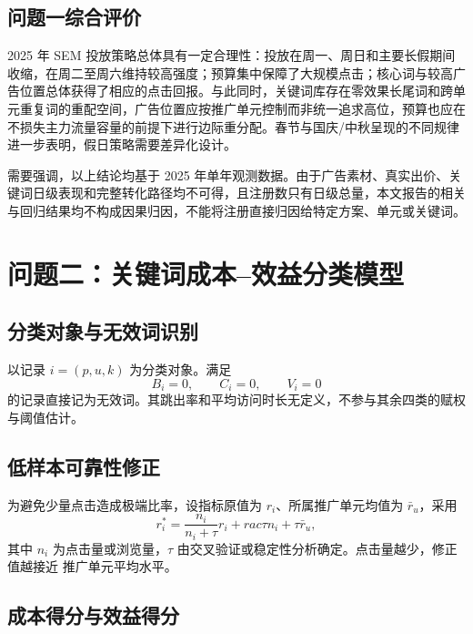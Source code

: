 \documentclass[UTF8,a4paper,zihao=-4]{ctexart}
\begin{document}
\subsection{问题一综合评价}

2025 年 SEM 投放策略总体具有一定合理性：投放在周一、周日和主要长假期间收缩，在周二至周六维持较高强度；预算集中保障了大规模点击；核心词与较高广告位置总体获得了相应的点击回报。与此同时，关键词库存在零效果长尾词和跨单元重复词的重配空间，广告位置应按推广单元控制而非统一追求高位，预算也应在不损失主力流量容量的前提下进行边际重分配。春节与国庆/中秋呈现的不同规律进一步表明，假日策略需要差异化设计。

需要强调，以上结论均基于 2025 年单年观测数据。由于广告素材、真实出价、关键词日级表现和完整转化路径均不可得，且注册数只有日级总量，本文报告的相关与回归结果均不构成因果归因，不能将注册直接归因给特定方案、单元或关键词。

\section{问题二：关键词成本--效益分类模型}

\iffalse

\subsection{分类对象与无效词识别}

以记录 $i=(p,u,k)$ 为分类对象。满足
\begin{equation}
  B_i=0,\qquad C_i=0,\qquad V_i=0
\end{equation}
的记录直接记为无效词。其跳出率和平均访问时长无定义，不参与其余四类的赋权与阈值估计。

\subsection{低样本可靠性修正}

为避免少量点击造成极端比率，设指标原值为 $r_i$、所属推广单元均值为 $\bar r_u$，采用
\begin{equation}
  r_i^{*}=\frac{n_i}{n_i+\tau}r_i+rac{\tau}{n_i+\tau}\bar r_u,
\end{equation}
其中 $n_i$ 为点击量或浏览量，$\tau$ 由交叉验证或稳定性分析确定。点击量越少，修正值越接近
推广单元平均水平。

\subsection{成本得分与效益得分}
\end{document}
